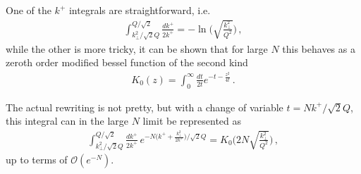 
One of the $k^{+}$ integrals are straightforward, i.e.
\begin{align}
    \int_{k_{\perp}^{2}/\sqrt{2}Q}^{Q/\sqrt{2}}\frac{dk^{+}}{2k^{+}}=-\ln\Big(\sqrt{\frac{k_{\perp}^{2}}{Q^{2}}}\Big)\,,
\end{align}
while the other is more tricky, it can be shown that for large $N$ this behaves as a zeroth order modified bessel function of the second kind
\begin{align}
    K_{0}(z)=\int_{0}^{\infty}\frac{dt}{2t}e^{-t-\frac{z^{2}}{4t}}\,.
\end{align}

The actual rewriting is not pretty, but with a change of variable $t=Nk^{+}/\sqrt{2}Q$, this integral can in the large $N$ limit be represented as
\begin{align}
    \int_{k_{\perp}^{2}/\sqrt{2}Q}^{Q/\sqrt{2}}\frac{dk^{+}}{2k^{+}}\,e^{-N\big(k^{+}+\frac{k_{\perp}^{2}}{2k^{+}}\big)/\sqrt{2}Q}=K_{0}\Big(2N\sqrt{\frac{k_{\perp}^{2}}{Q^{2}}}\Big)\,,
\end{align}
up to terms of $\mathcal{O}(e^{-N})$.

